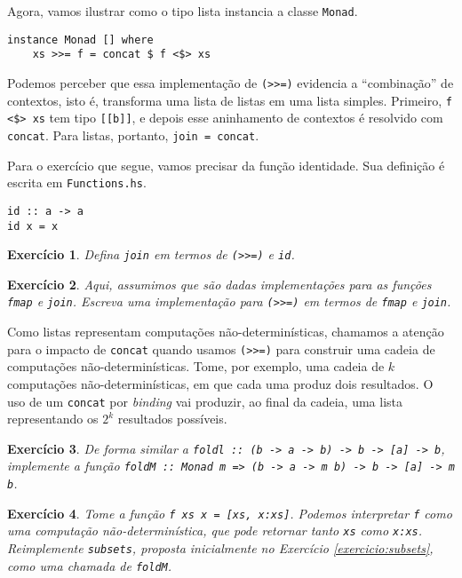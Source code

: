 \documentclass[a4paper]{article}
\newtheorem{exercicio}{Exercício}
\begin{document}
Agora, vamos ilustrar como o tipo lista instancia a classe \texttt{Monad}.

\begin{verbatim}
instance Monad [] where
	xs >>= f = concat $ f <$> xs
\end{verbatim}

Podemos perceber que essa implementação de \texttt{(>>=)} evidencia a ``combinação'' de contextos, isto é, transforma uma lista de listas em uma lista simples.
Primeiro, \texttt{f <\$> xs} tem tipo \texttt{[[b]]}, e depois esse aninhamento de contextos é resolvido com \texttt{concat}.
Para listas, portanto, \mbox{\texttt{join = concat}}.

Para o exercício que segue, vamos precisar da função identidade.
Sua definição é escrita em \texttt{Functions.hs}.

\begin{verbatim}
id :: a -> a
id x = x
\end{verbatim}

\begin{exercicio}
	Defina \emph{\texttt{join}} em termos de \emph{\texttt{(>>=)}} e \emph{\texttt{id}}.
\end{exercicio}

\begin{exercicio}
	Aqui, assumimos que são dadas implementações para as funções \mbox{\emph{\texttt{fmap}}} e \mbox{\emph{\texttt{join}}}.
	Escreva uma implementação para \emph{\texttt{(>>=)}} em termos de \emph{\texttt{fmap}} e \emph{\texttt{join}}.
\end{exercicio}

Como listas representam computações não-determinísticas, chamamos a atenção para o impacto de \texttt{concat} quando usamos \texttt{(>>=)} para construir uma cadeia de computações não-determinísticas.
Tome, por exemplo, uma cadeia de $k$ computações não-determinísticas, em que cada uma produz dois resultados.
O uso de um \texttt{concat} por \emph{binding} vai produzir, ao final da cadeia, uma lista representando os $2^k$ resultados possíveis.

\begin{exercicio} \label{exercicio:foldM}
	De forma similar a \emph{\texttt{foldl :: (b -> a -> b) -> b -> [a] -> b}}, implemente a função \emph{\texttt{foldM :: Monad m => (b -> a -> m b) -> b -> [a] -> m b}}.
\end{exercicio}

\begin{exercicio}
	Tome a função \emph{\texttt{f xs x = [xs, x:xs]}}.
	Podemos interpretar \emph{\texttt{f}} como uma computação não-determinística, que pode retornar tanto \emph{\texttt{xs}} como \emph{\texttt{x:xs}}.
	Reimplemente \emph{\texttt{subsets}}, proposta inicialmente no Exercício \ref{exercicio:subsets}, como uma chamada de \emph{\texttt{foldM}}.
\end{exercicio}
\end{document}
